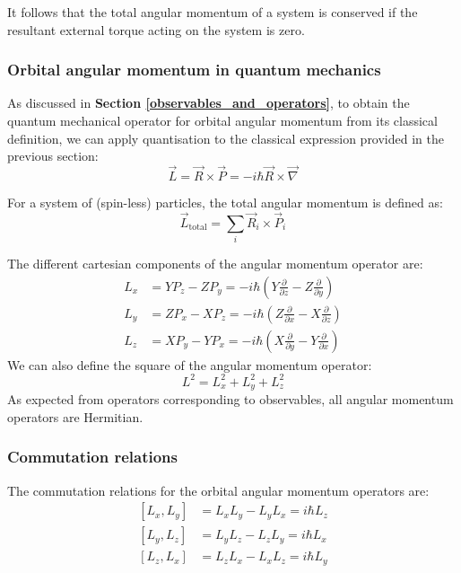 It follows that the total angular momentum of a system is conserved if the resultant external torque acting on the system is zero.

\subsubsection{Orbital angular momentum in quantum mechanics}

As discussed in \textbf{Section \ref{observables_and_operators}}, to obtain the quantum mechanical operator for orbital angular momentum from its classical definition, we can apply quantisation to the classical expression provided in the previous section:
\begin{equation}
    \vec{L} = \vec{R} \times \vec{P} = -i\hbar \vec{R}\times \vec{\nabla}
\end{equation}

For a system of (spin-less) particles, the total angular momentum is defined as:
\begin{equation}
    \vec{L}_\text{total} = \sum_i \vec{R}_i \times \vec{P}_i
\end{equation}

The different cartesian components of the angular momentum operator are:
\begin{equation} \label{orbital_angular_momentum_operators}
    \begin{split}
        L_x &= YP_z - ZP_y = -i\hbar \left(Y\frac{\partial}{\partial z} - Z\frac{\partial}{\partial y}\right) \\
        L_y &= ZP_x - XP_z = -i\hbar \left(Z\frac{\partial}{\partial x} - X\frac{\partial}{\partial z}\right) \\
        L_z &= XP_y - YP_x = -i\hbar \left(X\frac{\partial}{\partial y} - Y\frac{\partial}{\partial x}\right)
    \end{split}
\end{equation}
We can also define the square of the angular momentum operator:
\begin{equation}
    L^2 = L_x^2 + L_y^2 + L_z^2
\end{equation}
As expected from operators corresponding to observables, all angular momentum operators are Hermitian.

\subsubsection{Commutation relations}

The commutation relations for the orbital angular momentum operators are:
\begin{equation}
    \begin{split}
        [L_x, L_y] &= L_xL_y - L_yL_x = i\hbar L_z \\
        [L_y, L_z] &= L_yL_z - L_zL_y = i\hbar L_x \\
        [L_z, L_x] &= L_zL_x - L_xL_z = i\hbar L_y
    \end{split}
\end{equation}

